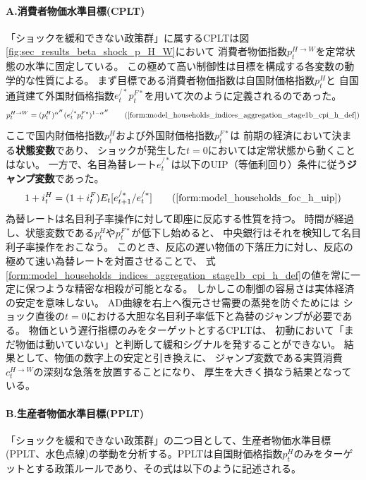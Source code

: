 \paragraph{A.消費者物価水準目標(CPLT)}\label{sec:sec_results_beta_shock_analysis_cplt}
「ショックを緩和できない政策群」に属するCPLTは図\ref{fig:sec_results_beta_shock_p_H_W}において
消費者物価指数\(p_t^{H\to W}\)を定常状態の水準に固定している。
この極めて高い制御性は目標を構成する各変数の動学的な性質による。
まず目標である消費者物価指数は自国財価格指数\(p_t^H\)と
自国通貨建て外国財価格指数\(e_t^{/*}p_t^{F*}\)を用いて次のように定義されるのであった。
\begin{equation}
    p_t^{H\to W}=(p_t^H)^{\alpha^H}(e_t^{/*}p_t^{F*})^{1-\alpha^H}
    \tag{\ref{form:model_households_indices_aggregation_stage1b_cpi_h_def}}
\end{equation}
ここで国内財価格指数\(p_t^H\)および外国財価格指数\(p_t^{F*}\)は
前期の経済において決まる\textbf{状態変数}であり、
ショックが発生した\(t=0\)においては定常状態から動くことはない。
一方で、名目為替レート\(e_t^{/*}\)は以下のUIP（等価利回り）条件に従う\textbf{ジャンプ変数}であった。
\begin{equation}
    1+i_t^H=(1+i_t^F)E_t[e_{t+1}^{/*}/e_t^{/*}]
    \tag{\ref{form:model_households_foc_h_uip}}
\end{equation}
為替レートは名目利子率操作に対して即座に反応する性質を持つ。
時間が経過し、状態変数である\(p_t^H\)や\(p_t^{F*}\)が低下し始めると、
中央銀行はそれを検知して名目利子率操作をおこなう。
このとき、反応の遅い物価の下落圧力に対し、反応の極めて速い為替レートを対置させることで、
式\eqref{form:model_households_indices_aggregation_stage1b_cpi_h_def}の値を常に一定に保つような精密な相殺が可能となる。
しかしこの制御の容易さは実体経済の安定を意味しない。
AD曲線を右上へ復元させ需要の蒸発を防ぐためには
ショック直後の\(t=0\)における大胆な名目利子率低下と為替のジャンプが必要である。
物価という遅行指標のみをターゲットとするCPLTは、
初動において「まだ物価は動いていない」と判断して緩和シグナルを発することができない。
結果として、物価の数字上の安定と引き換えに、
ジャンプ変数である実質消費\(c_t^{H\to W}\)の深刻な急落を放置することになり、
厚生を大きく損なう結果となっている。

\paragraph{B.生産者物価水準目標(PPLT)}\label{sec:sec_results_beta_shock_analysis_pplt}
「ショックを緩和できない政策群」の二つ目として、生産者物価水準目標(PPLT、水色点線)の挙動を分析する。PPLTは自国財価格指数\(p_t^H\)のみをターゲットとする政策ルールであり、その式は以下のように記述される。

